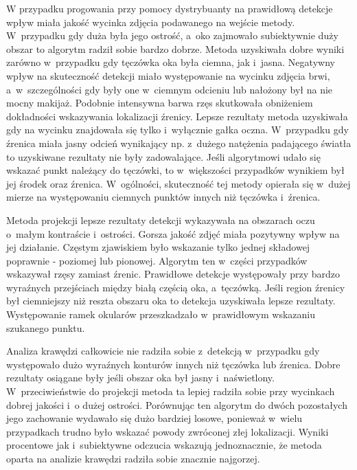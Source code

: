 W przypadku progowania przy pomocy dystrybuanty na prawidłową detekcje wpływ miała jakość wycinka zdjęcia podawanego na wejście metody. W~przypadku gdy duża była jego ostrość, a~oko zajmowało subiektywnie duży obszar to algorytm radził sobie bardzo dobrze. Metoda uzyskiwała dobre wyniki zarówno w~przypadku gdy tęczówka oka była ciemna, jak i~jasna. Negatywny wpływ na skuteczność detekcji miało występowanie na wycinku zdjęcia brwi, a~w~szczególności gdy były one w~ciemnym odcieniu lub nałożony był na nie mocny makijaż. Podobnie intensywna barwa rzęs skutkowała obniżeniem dokładności wskazywania lokalizacji źrenicy. Lepsze rezultaty metoda uzyskiwała gdy na wycinku znajdowała się tylko i~wyłącznie gałka oczna. W~przypadku gdy źrenica miała jasny odcień wynikający np. z~dużego natężenia padającego światła to uzyskiwane rezultaty nie były zadowalające. Jeśli algorytmowi udało się wskazać punkt należący do tęczówki, to w~większości przypadków wynikiem był jej środek oraz źrenica. W~ogólności, skuteczność tej metody opierała się w~dużej mierze na występowaniu ciemnych punktów innych niż tęczówka i~źrenica.

\par

Metoda projekcji lepsze rezultaty detekcji wykazywała na obszarach oczu o~małym kontraście i~ostrości. Gorsza jakość zdjęć miała pozytywny wpływ na jej działanie. Częstym zjawiskiem było wskazanie tylko jednej składowej poprawnie - poziomej lub pionowej. Algorytm ten w~części przypadków wskazywał rzęsy zamiast źrenic. Prawidłowe detekcje występowały przy bardzo wyraźnych przejściach między białą częścią oka, a~tęczówką. Jeśli region źrenicy był ciemniejszy niż reszta obszaru oka to detekcja uzyskiwała lepsze rezultaty. Występowanie ramek okularów przeszkadzało w~prawidłowym wskazaniu szukanego punktu.

\par

Analiza krawędzi całkowicie nie radziła sobie z~detekcją w~przypadku gdy występowało dużo wyraźnych konturów innych niż tęczówka lub źrenica. Dobre rezultaty osiągane były jeśli obszar oka był jasny i~naświetlony. W~przeciwieństwie do projekcji metoda ta lepiej radziła sobie przy wycinkach dobrej jakości i~o dużej ostrości. Porównując ten algorytm do dwóch pozostałych jego zachowanie wydawało się dużo bardziej losowe, ponieważ w~wielu przypadkach trudno było wskazać powody zwróconej złej lokalizacji. Wyniki procentowe jak i~subiektywne odczucia wskazują jednoznacznie, że metoda oparta na analizie krawędzi radziła sobie znacznie najgorzej.





